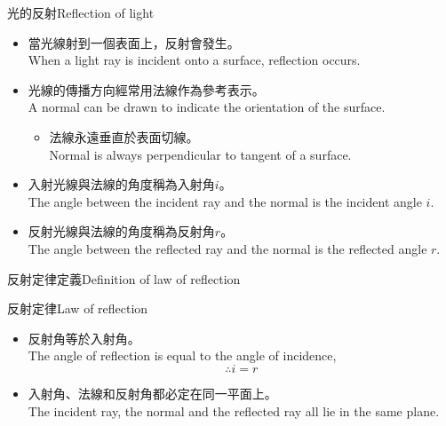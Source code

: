 \documentclass[beamer=true]{standalone}
\begin{document}
\begin{frame}{光的反射Reflection of light}
    
    \begin{itemize}
        \item 當光線射到一個表面上，反射會發生。\\When a light ray is incident onto a surface, reflection occurs.
        \item 光線的傳播方向經常用法線作為參考表示。\\A normal can be drawn to indicate the orientation of the surface.
        \begin{itemize}
            \item 法線永遠垂直於表面切線。\\Normal is always perpendicular to tangent of a surface.
        \end{itemize}
        \item 入射光線與法線的角度稱為入射角$i$。\\The angle between the incident ray and the normal is the incident angle $i$.
        \item 反射光線與法線的角度稱為反射角$r$。\\The angle between the reflected ray and the normal is the reflected angle $r$.
    \end{itemize}
\end{frame}



\begin{frame}{反射定律定義Definition of law of reflection}
    \begin{alertblock}
        {反射定律Law of reflection}
        \begin{itemize}
        \setlength{\itemsep}{.6em}
            \item 反射角等於入射角。\\The angle of reflection is equal to the angle of incidence, \medskip
            \begin{equation}
                \therefore i=r
            \end{equation}
            \item 入射角、法線和反射角都必定在同一平面上。\\The incident ray, the normal and the reflected ray all lie in the same plane.
        \end{itemize}
    \end{alertblock}

    
\end{frame}
\end{document}
